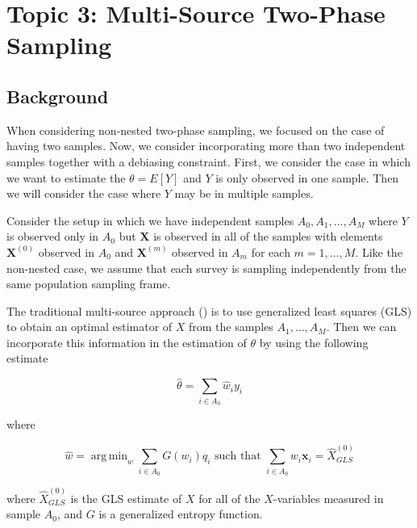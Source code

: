 \documentclass[12pt]{article}
\DeclareMathOperator*{\argmin}{arg\,min}
\renewcommand{\bf}[1]{\mathbf{#1}}
\begin{document}
\section{Topic 3: Multi-Source Two-Phase Sampling}

\subsection{Background}

When considering non-nested two-phase sampling, we focused on the case of having
two samples. Now, we consider incorporating more than two independent samples
together with a debiasing constraint. First, we consider the case in which we
want to estimate the $\theta = E[Y]$ and $Y$ is only observed in one sample.
Then we will consider the case where $Y$ may be in multiple samples.

Consider the setup in which we have independent samples $A_0, A_1, \dots, A_M$
where $Y$ is observed only in $A_0$ but $\bf X$ is observed in all of the
samples with elements $\bf X^{(0)}$ observed in $A_0$ and $\bf X^{(m)}$ observed
in $A_m$ for each $m = 1, \dots, M$. Like the non-nested case, we assume that
each survey is sampling independently from the same population sampling frame.

The traditional multi-source approach (\cite{kim2024statistics}) is to use
generalized least squares (GLS) to obtain an optimal estimator of $X$ from the
samples $A_1, \dots, A_M$. Then we can incorporate this information in the
estimation of $\theta$ by using the following estimate 

$$\hat \theta = \sum_{i \in A_0} \hat w_i y_i$$

where 

\begin{equation}\label{eq:mstps}
\hat w = \argmin_w \sum_{i \in A_0} G(w_i)q_i \text{ such that } \sum_{i \in
A_0} w_i \bf x_i = \hat X_{GLS}^{(0)}
\end{equation}

where $\hat X_{GLS}^{(0)}$ is the GLS estimate of $X$ for all of the
$X$-variables measured in sample $A_0$, and $G$ is a generalized entropy
function. 

\end{document}
